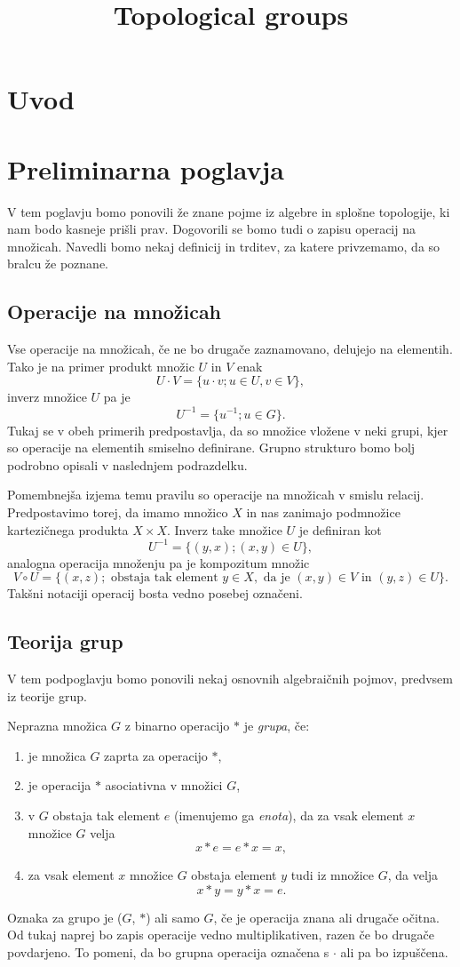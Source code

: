 \documentclass[mat1]{fmfdelo}
\title{Topological groups}
\begin{document}
\section{Uvod}

\section{Preliminarna poglavja}
V tem poglavju bomo ponovili že znane pojme iz algebre in splošne topologije, ki nam bodo kasneje prišli prav. Dogovorili se bomo tudi o zapisu operacij na množicah. Navedli bomo nekaj definicij in trditev, za katere privzemamo, da so bralcu že poznane.

\subsection{Operacije na množicah}\label{sec:opnamnozicah}
Vse operacije na množicah, če ne bo drugače za\-zna\-mo\-va\-no, delujejo na elementih. Tako je na primer produkt množic $U$ in $V$ enak \[U \cdot V = \lbrace u \cdot v ; u \in U, v \in V \rbrace, \] inverz množice $U$ pa je \[ U^{-1} = \lbrace u^{-1} ; u \in G \rbrace. \] Tukaj se v obeh primerih predpostavlja, da so množice vložene v neki grupi, kjer so operacije na elementih smiselno definirane. Grupno strukturo bomo bolj podrobno opisali v naslednjem podrazdelku.

Pomembnejša izjema temu pravilu so operacije na množicah v smislu relacij. Predpostavimo torej, da imamo množico $X$ in nas zanimajo podmnožice kartezičnega produkta $X \times X$. Inverz take množice $U$ je definiran kot \[ U^{-1} = \lbrace (y, x) ; (x, y) \in U \rbrace, \]
analogna operacija množenju pa je kompozitum množic \[ V \circ U = \lbrace (x, z) ; \text{ obstaja tak element } y \in X, \text{ da je } (x, y) \in V \text{ in } (y, z) \in U \rbrace. \]
Takšni notaciji operacij bosta vedno posebej označeni.

\subsection{Teorija grup}
V tem podpoglavju bomo ponovili nekaj osnovnih algebraičnih pojmov, predvsem iz teorije grup.

Neprazna množica $G$ z binarno operacijo $*$ je \emph{grupa}, če:
\begin{enumerate}
\item je množica $G$ zaprta za operacijo $*$,
\item je operacija $*$ asociativna v množici $G$,
\item v $G$ obstaja tak element $e$ (imenujemo ga \emph{enota}), da za vsak element $x$ množice $G$ velja \[ x*e = e*x = x, \]
\item za vsak element $x$ množice $G$ obstaja element $y$ tudi iz množice $G$, da velja \[ x*y = y*x = e. \]
\end{enumerate}
Oznaka za grupo je ($G$, $*$) ali samo $G$, če je operacija znana ali drugače očitna. Od tukaj naprej bo zapis operacije vedno multiplikativen, razen če bo drugače povdarjeno. To pomeni, da bo grupna operacija označena s $\cdot$ ali pa bo izpuščena.
\end{document}
